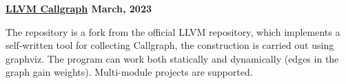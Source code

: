 \textbf{\href{https://github.com/jirol9xa/llvm-practice} {LLVM Callgraph} \hfill  March, 2023} \par
\begin{itemize}
The repository is a fork from the official LLVM repository, which implements a self-written tool for collecting Callgraph, the construction is carried out using graphviz. The program can work both statically and dynamically (edges in the graph gain weights). Multi-module projects are supported. 
\end{itemize} \par